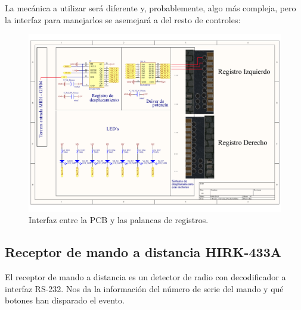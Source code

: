 La mecánica a utilizar será diferente y, probablemente, algo más compleja, pero la interfaz para manejarlos se asemejará a del resto de controles:

\smallskip

\begin{figure}[H]
	\noindent \begin{centering}
		\includegraphics[width=\linewidth*2/3]{capitulo3/pcb_registros}
		\par\end{centering}
	\smallskip
	\caption{\label{fig:pcb_registros} Interfaz entre la PCB y las palancas de registros.}
\end{figure} 

\smallskip

\subsection{Receptor de mando a distancia HIRK-433A}

El receptor de mando a distancia es un detector de radio con decodificador a interfaz RS-232. Nos da la información del número de serie del mando y qué botones han disparado el evento. 

\smallskip

